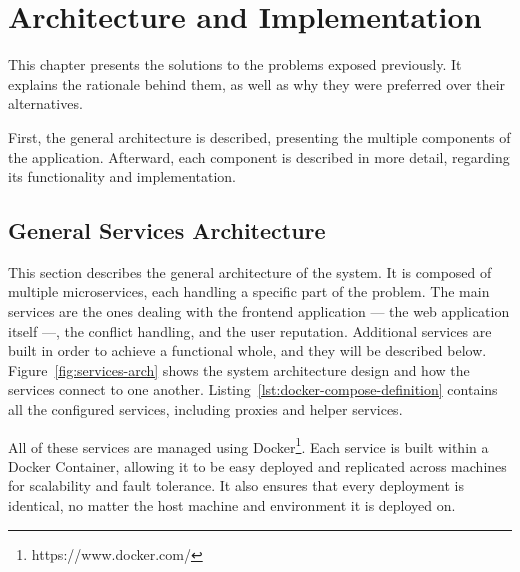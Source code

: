 \chapter{Architecture and Implementation}\label{chap:solution}

This chapter presents the solutions to the problems exposed previously. It explains the rationale behind them, as well as why they were preferred over their alternatives.

First, the general architecture is described, presenting the multiple components of the application. Afterward, each component is described in more detail, regarding its functionality and implementation.

\section{General Services Architecture}

This section describes the general architecture of the system. It is composed of multiple microservices, each handling a specific part of the problem. The main services are the ones dealing with the frontend application --- the web application itself ---, the conflict handling, and the user reputation. Additional services are built in order to achieve a functional whole, and they will be described below. Figure~\ref{fig:services-arch} shows the system architecture design and how the services connect to one another. Listing~\ref{lst:docker-compose-definition} contains all the configured services, including proxies and helper services.

All of these services are managed using Docker\footnote{https://www.docker.com/}. Each service is built within a Docker Container, allowing it to be easy deployed and replicated across machines for scalability and fault tolerance. It also ensures that every deployment is identical, no matter the host machine and environment it is deployed on.

